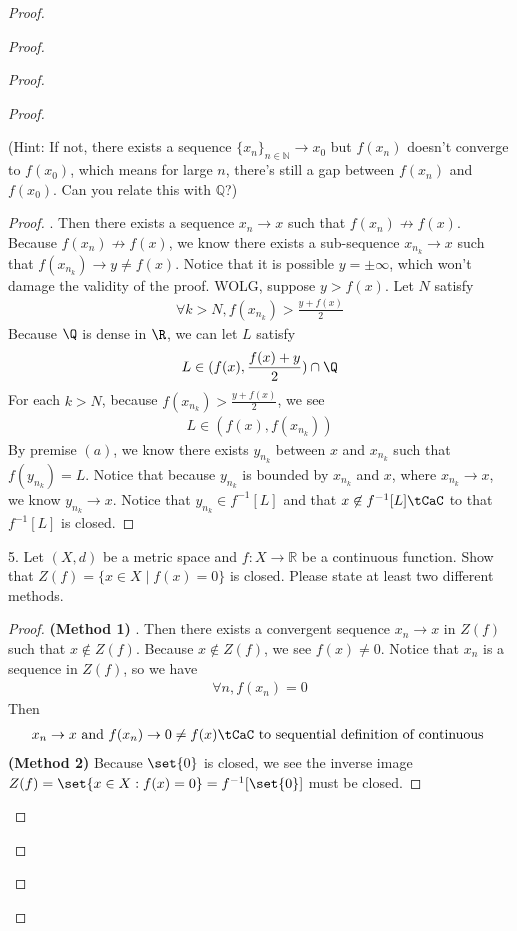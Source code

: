 \documentclass{report}
\begin{document}
\begin{proof}
\begin{proof}
\begin{proof}
\begin{proof}
\begin{question}{}{}
(Hint: If not, there exists a sequence \( \{x_n\}_{n\in\mathbb{N}} \rightarrow x_0 \) but \( f(x_n) \) doesn't converge to \( f(x_0) \), which means for large \( n \), there's still a gap between \( f(x_n) \) and \( f(x_0) \). Can you relate this with \( \mathbb{Q} \)?)
\end{question}
\begin{proof}
  . Then there exists a sequence $x_n\to x$ such that $f(x_n)\not \to f(x)$. Because $f(x_n)\not \to f(x)$, we know there exists a sub-sequence $x_{n_k}\to x$ such that $f(x_{n_k})\to y \neq f(x)$. Notice that it is possible $y=\pm \infty$, which won't damage the validity of the proof. WOLG, suppose $y>f(x)$. Let $N$ satisfy 
   \begin{align*}
  \forall k>N, f(x_{n_k})>\frac{y+f(x)}{2}
  \end{align*}
Because $\Q$ is dense in $\R$, we can let $L$ satisfy 
\begin{align*}
L\in (f(x),\frac{f(x)+y}{2})\cap \Q
\end{align*}
For each $k>N$, because $f(x_{n_k})>\frac{y+f(x)}{2}$, we see 
\begin{align*}
L\in (f(x),f(x_{n_k}))
\end{align*}
By premise $(a)$, we know there exists $y_{n_k}$ between $x$ and  $x_{n_k}$ such that $f(y_{n_k})=L$. Notice that because $y_{n_k}$ is bounded by $x_{n_k}$ and $x$, where  $x_{n_k}\to x$, we know $y_{n_k}\to x$. Notice that $y_{n_k}\in f^{-1}[L]$ and that $x\not \in f^{-1}[L]\tCaC$ to that $f^{-1}[L]$ is closed. 
\end{proof}
\begin{question}{}{}
5. Let \( (X, d) \) be a metric space and \( f : X \to \mathbb{R} \) be a continuous function. Show that \( Z(f) = \{x \in X \mid f(x) = 0\} \) is closed. Please state at least two different methods.
\end{question}
\begin{proof}
\textbf{(Method 1)}
. Then there exists a convergent sequence $x_n\rightarrow x$ in $Z(f)$ such that $x\not \in Z(f)$. Because $x\not\in Z(f)$, we see $f(x)\neq 0$. Notice that  $x_n$ is a sequence in  $Z(f)$, so we have 
\begin{align*}
\forall n,f(x_n)=0
\end{align*}
Then 
\begin{align*}
x_n\rightarrow x\text{ and }f(x_n)\rightarrow 0\neq f(x)\tCaC \text{ to sequential definition of continuous }
\end{align*}
\textbf{(Method 2)} Because $\set{0}$ is closed, we see the inverse image  $Z(f)=\set{x\in X:f(x)=0}=f^{-1}[\set{0}]$ must be closed.
\end{proof}


\end{proof}
\end{proof}
\end{proof}
\end{proof}
\end{document}
